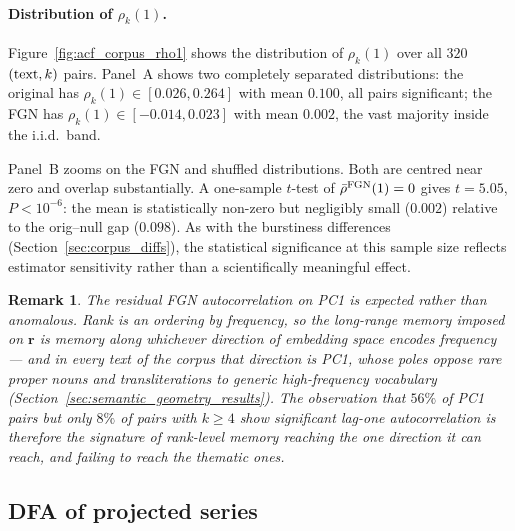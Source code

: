 \documentclass[preprint]{elsarticle}
\newtheorem{remark}{Remark}
\begin{document}
\paragraph{Distribution of $\rho_k(1)$.}
Figure~\ref{fig:acf_corpus_rho1} shows the distribution of
$\rho_k(1)$ over all $320$ $({\rm text}, k)$ pairs.
Panel~A shows two completely separated distributions: the original
has $\rho_k(1) \in [0.026, 0.264]$ with mean $0.100$, all
pairs significant; the FGN has $\rho_k(1) \in [-0.014, 0.023]$
with mean $0.002$, the vast majority inside the i.i.d.\ band.

Panel~B zooms on the FGN and shuffled distributions.
Both are centred near zero and overlap substantially.
A one-sample $t$-test of $\bar\rho^{\rm FGN}(1) = 0$ gives
$t = 5.05$, $P < 10^{-6}$: the mean is statistically non-zero but
negligibly small ($0.002$) relative to the orig--null gap ($0.098$).
As with the burstiness differences (Section~\ref{sec:corpus_diffs}),
the statistical significance at this sample size reflects estimator
sensitivity rather than a scientifically meaningful effect.


\begin{remark}
  The residual FGN autocorrelation on PC1 is expected rather than
  anomalous. Rank is an ordering by frequency, so the long-range memory
  imposed on $\mathbf{r}$ is memory along whichever direction of
  embedding space encodes frequency --- and in every text of the corpus
  that direction is PC1, whose poles oppose rare proper nouns and
  transliterations to generic high-frequency vocabulary
  (Section~\ref{sec:semantic_geometry_results}).
  The observation that $56\%$ of PC1 pairs but only $8\%$ of pairs with
  $k \geq 4$ show significant lag-one autocorrelation is therefore the
  signature of rank-level memory reaching the one direction it can
  reach, and failing to reach the thematic ones.
\end{remark}









\subsection{DFA of projected series}
\label{sec:dfa_projections}
\end{document}
